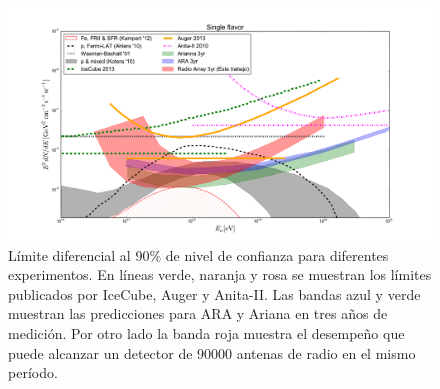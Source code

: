 	\begin{figure}[h!]
		\begin{center}
			\includegraphics[width=\textwidth]{fig/resultadosRadio/limits_future}
			\caption{\label{fig:limitesRadio}
			L\'imite diferencial al 90$\%$ de nivel de confianza para diferentes experimentos.
			En l\'ineas verde, naranja y rosa se muestran los l\'imites publicados por IceCube, Auger y Anita-II. 
			Las bandas azul y verde muestran las predicciones para ARA y Ariana en tres a\~nos de medici\'on. Por otro lado la banda roja muestra el desempe\~no que puede alcanzar un detector de 90000 antenas de radio en el mismo per\'iodo.}
		\end{center}
	\end{figure}
	
	